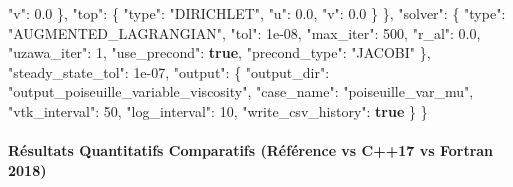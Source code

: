 \documentclass[
  10pt,
]{article}
\newenvironment{Shaded}{}{}
\newcommand{\DataTypeTok}[1]{\textcolor[rgb]{0.56,0.13,0.00}{#1}}
\newcommand{\DecValTok}[1]{\textcolor[rgb]{0.25,0.63,0.44}{#1}}
\newcommand{\FloatTok}[1]{\textcolor[rgb]{0.25,0.63,0.44}{#1}}
\newcommand{\FunctionTok}[1]{\textcolor[rgb]{0.02,0.16,0.49}{#1}}
\newcommand{\KeywordTok}[1]{\textcolor[rgb]{0.00,0.44,0.13}{\textbf{#1}}}
\newcommand{\StringTok}[1]{\textcolor[rgb]{0.25,0.44,0.63}{#1}}
\begin{document}
\begin{Shaded}
\begin{Highlighting}[]
      \DataTypeTok{"v"}\FunctionTok{:} \FloatTok{0.0}
    \FunctionTok{\},}
    \DataTypeTok{"top"}\FunctionTok{:} \FunctionTok{\{}
      \DataTypeTok{"type"}\FunctionTok{:} \StringTok{"DIRICHLET"}\FunctionTok{,}
      \DataTypeTok{"u"}\FunctionTok{:} \FloatTok{0.0}\FunctionTok{,}
      \DataTypeTok{"v"}\FunctionTok{:} \FloatTok{0.0}
    \FunctionTok{\}}
  \FunctionTok{\},}
  \DataTypeTok{"solver"}\FunctionTok{:} \FunctionTok{\{}
    \DataTypeTok{"type"}\FunctionTok{:} \StringTok{"AUGMENTED\_LAGRANGIAN"}\FunctionTok{,}
    \DataTypeTok{"tol"}\FunctionTok{:} \DecValTok{1e{-}08}\FunctionTok{,}
    \DataTypeTok{"max\_iter"}\FunctionTok{:} \DecValTok{500}\FunctionTok{,}
    \DataTypeTok{"r\_al"}\FunctionTok{:} \FloatTok{0.0}\FunctionTok{,}
    \DataTypeTok{"uzawa\_iter"}\FunctionTok{:} \DecValTok{1}\FunctionTok{,}
    \DataTypeTok{"use\_precond"}\FunctionTok{:} \KeywordTok{true}\FunctionTok{,}
    \DataTypeTok{"precond\_type"}\FunctionTok{:} \StringTok{"JACOBI"}
  \FunctionTok{\},}
  \DataTypeTok{"steady\_state\_tol"}\FunctionTok{:} \DecValTok{1e{-}07}\FunctionTok{,}
  \DataTypeTok{"output"}\FunctionTok{:} \FunctionTok{\{}
    \DataTypeTok{"output\_dir"}\FunctionTok{:} \StringTok{"output\_poiseuille\_variable\_viscosity"}\FunctionTok{,}
    \DataTypeTok{"case\_name"}\FunctionTok{:} \StringTok{"poiseuille\_var\_mu"}\FunctionTok{,}
    \DataTypeTok{"vtk\_interval"}\FunctionTok{:} \DecValTok{50}\FunctionTok{,}
    \DataTypeTok{"log\_interval"}\FunctionTok{:} \DecValTok{10}\FunctionTok{,}
    \DataTypeTok{"write\_csv\_history"}\FunctionTok{:} \KeywordTok{true}
  \FunctionTok{\}}
\FunctionTok{\}}
\end{Highlighting}
\end{Shaded}

\paragraph{Résultats Quantitatifs Comparatifs (Référence vs C++17 vs
Fortran
2018)}\label{ruxe9sultats-quantitatifs-comparatifs-ruxe9fuxe9rence-vs-c17-vs-fortran-2018-3}
\end{document}
